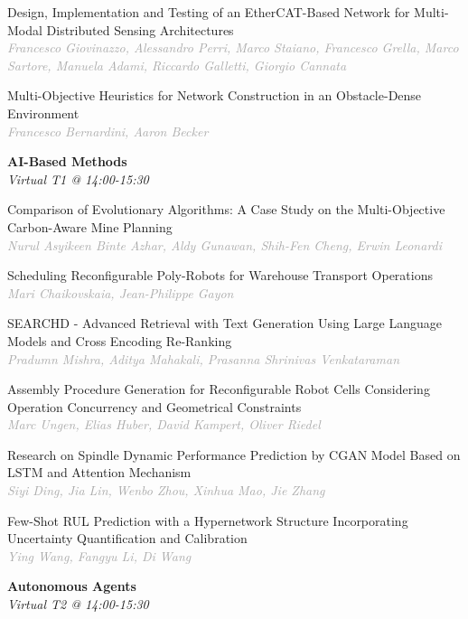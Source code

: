 \begin{multicols*}{2}
\small Design, Implementation and Testing of an EtherCAT-Based Network for Multi-Modal Distributed Sensing Architectures\\ 
\footnotesize \textcolor{darkgray}{\textit{Francesco Giovinazzo, Alessandro  Perri, Marco  Staiano, Francesco  Grella, Marco  Sartore, Manuela  Adami, Riccardo  Galletti, Giorgio  Cannata}}

\small Multi-Objective Heuristics for Network Construction in an Obstacle-Dense Environment\\ 
\footnotesize \textcolor{darkgray}{\textit{Francesco Bernardini, Aaron  Becker}}

\normalsize \textbf{AI-Based Methods}\\
\small \textit{Virtual T1 @ 14:00-15:30}

\small Comparison of Evolutionary Algorithms: A Case Study on the Multi-Objective Carbon-Aware Mine Planning\\ 
\footnotesize \textcolor{darkgray}{\textit{Nurul Asyikeen Binte Azhar, Aldy  Gunawan, Shih-Fen  Cheng, Erwin  Leonardi}}

\small Scheduling Reconfigurable Poly-Robots for Warehouse Transport Operations\\ 
\footnotesize \textcolor{darkgray}{\textit{Mari Chaikovskaia, Jean-Philippe  Gayon}}

\small SEARCHD - Advanced Retrieval with Text Generation Using Large Language Models and Cross Encoding Re-Ranking\\ 
\footnotesize \textcolor{darkgray}{\textit{Pradumn Mishra, Aditya  Mahakali, Prasanna Shrinivas  Venkataraman}}

\small Assembly Procedure Generation for Reconfigurable Robot Cells Considering Operation Concurrency and Geometrical Constraints\\ 
\footnotesize \textcolor{darkgray}{\textit{Marc Ungen, Elias  Huber, David  Kampert, Oliver  Riedel}}

\small Research on Spindle Dynamic Performance Prediction by CGAN Model Based on LSTM and Attention Mechanism\\ 
\footnotesize \textcolor{darkgray}{\textit{Siyi Ding, Jia  Lin, Wenbo  Zhou, Xinhua  Mao, Jie  Zhang}}

\small Few-Shot RUL Prediction with a Hypernetwork Structure Incorporating Uncertainty Quantification and Calibration\\ 
\footnotesize \textcolor{darkgray}{\textit{Ying Wang, Fangyu  Li, Di  Wang}}

\normalsize \textbf{Autonomous Agents}\\
\small \textit{Virtual T2 @ 14:00-15:30}


\end{multicols*}
